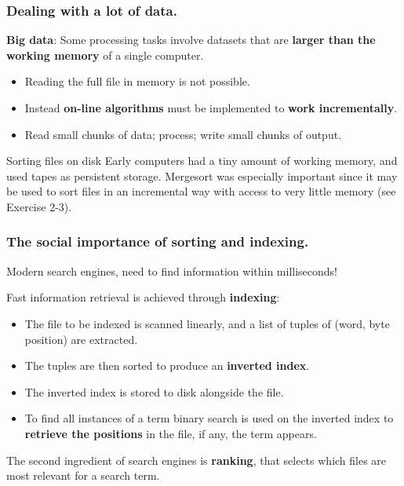 \documentclass{beamer} %
\newcommand\emc[1]{\textcolor{brightblue}{\textbf{#1}}}
\begin{document}


\begin{frame}
\frametitle{Dealing with a lot of data.}

\emc{Big data}: Some processing tasks involve datasets that are \emc{larger than the working memory} of a single computer.
\begin{itemize}
\item Reading the full file in memory is not possible.
\item Instead \emc{on-line algorithms} must be implemented to \emc{work incrementally}.
\item Read small chunks of data; process; write small chunks of output.
\end{itemize}

\begin{block}{Sorting files on disk}
Early computers had a tiny amount of working memory, and used tapes as persistent storage. Mergesort was especially important since it may be used to sort files in an incremental way with access to very little memory (see Exercise 2-3).
\end{block}

\end{frame}

\begin{frame}
\frametitle{The social importance of sorting and indexing.}

Modern search engines, need to find information within milliseconds!

\vspace{3mm}
Fast information retrieval is achieved through \emc{indexing}:
\begin{itemize}
	\item The file to be indexed is scanned linearly, and a list of tuples of (word, byte position) are extracted.
	\item The tuples are then sorted to produce an \emc{inverted index}.
	\item The inverted index is stored to disk alongside the file.
	\item To find all instances of a term binary search is used on the inverted index to \emc{retrieve the positions} in the file, if any, the term appears.
\end{itemize}

The second ingredient of search engines is \emc{ranking}, that selects which files are most relevant for a search term.
\end{frame}
\end{document}
